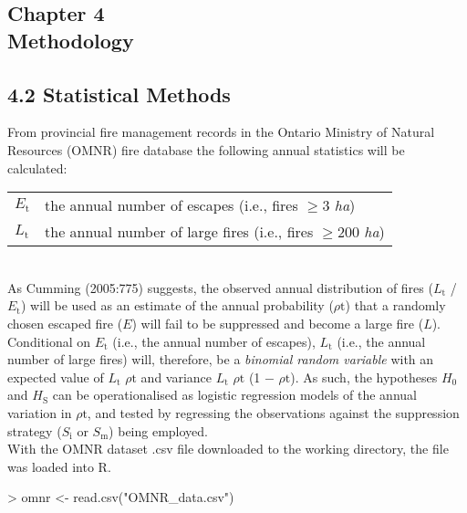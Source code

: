 \documentclass{article}
\begin{document}


\begin{spacing}{1.5}
\phantom
\phantom
\phantom
\phantom
\section*{Chapter 4 \\ \huge{Methodology}}
\phantom
\phantom
\subsection*{4.2 Statistical Methods}

From provincial fire management records in the Ontario Ministry of Natural Resources (OMNR) fire database the following annual statistics will be calculated:\\

\begin{tabular}{ll}
$E_{\mathrm{t}}$     & the annual number of escapes (i.e., fires  $\geq$3 {\it ha})\\
$L_{\mathrm{t}}$     & the annual number of large fires (i.e., fires $\geq$200 {\it ha})\\
\end{tabular}\\

\noindent As Cumming (2005:775) suggests, the observed annual distribution of fires ($L_{\mathrm{t}}$ / $E_{\mathrm{t}}$) will be used as an estimate of the annual probability ($\rho{\mathrm{t}}$) that a randomly chosen escaped fire ($E$) will fail to be suppressed and become a large fire ($L$). \\

Conditional on $E_{\mathrm{t}}$ (i.e., the annual number of escapes), $L_{\mathrm{t}}$ (i.e., the annual number of large fires) will, therefore, be a {\it binomial random variable} with an expected value of $L_{\mathrm{t}}$ $\rho{\mathrm{t}}$ and variance $L_{\mathrm{t}}$ $\rho{\mathrm{t}}$ (1 $-$ $\rho{\mathrm{t}}$). As such, the hypotheses $H_{\mathrm{0}}$ and $H_{\mathrm{S}}$ can be operationalised as logistic regression models of the annual variation in $\rho{\mathrm{t}}$, and tested by regressing the observations against the suppression strategy ($S_{\mathrm{i}}$ or $S_{\mathrm{m}}$) being employed. \\


\noindent With the OMNR dataset .csv file downloaded to the working directory, the file was loaded into R.

\begin{Schunk}
\begin{Sinput}
> omnr <- read.csv("OMNR_data.csv")
\end{Sinput}
\end{Schunk}


\end{spacing}
\end{document}
